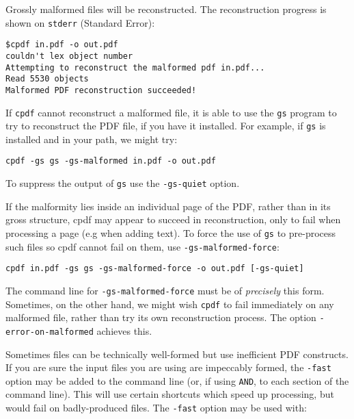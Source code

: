 \documentclass{book}
\begin{document}
Grossly malformed files will be reconstructed. The reconstruction
progress is shown on \verb!stderr! (Standard Error):

\begin{framed}
\noindent\small\verb!$cpdf in.pdf -o out.pdf!\\
\small\verb!couldn't lex object number!\\
\small\verb!Attempting to reconstruct the malformed pdf in.pdf...!\\
\small\verb!Read 5530 objects!\\
\small\verb$Malformed PDF reconstruction succeeded!$
\end{framed}

\noindent If \texttt{cpdf} cannot reconstruct a malformed file, it is able to use the \texttt{gs} program to try to reconstruct the PDF file, if you have it installed. For example, if \texttt{gs} is installed and in your path, we might try:

\begin{framed}
\noindent\small\verb!cpdf -gs gs -gs-malformed in.pdf -o out.pdf!\end{framed}

\noindent To suppress the output of \texttt{gs} use the \texttt{-gs-quiet} option.

If the malformity lies inside an individual page of the PDF, rather than in its gross structure, cpdf may appear to succeed in reconstruction, only to fail when processing a page (e.g when adding text). To force the use of \texttt{gs} to pre-process such files so cpdf cannot fail on them, use \texttt{-gs\--malformed\--force}:

\begin{framed}
\noindent\small\verb!cpdf in.pdf -gs gs -gs-malformed-force -o out.pdf [-gs-quiet]!\end{framed}

\noindent The command line for \texttt{-gs-malformed-force} must be of \textit{precisely} this form. Sometimes, on the other hand, we might wish \texttt{cpdf} to fail immediately on any malformed file, rather than try its own reconstruction process. The option \texttt{-error-on-malformed} achieves this.


Sometimes files can be technically well-formed but use inefficient PDF
constructs.  If you are sure the input files you are using are
impeccably formed, the \texttt{-fast} option may be added to the command line (or, if
using \texttt{AND}, to each section of the command line). This will use certain
shortcuts which speed up processing, but would fail on badly-produced files. The \verb!-fast! option may be used with:
\end{document}
